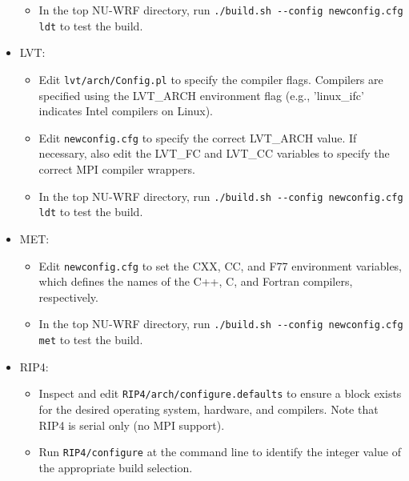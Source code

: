 \begin{itemize}
\begin{itemize}
  \item In the top NU-WRF directory, run 
    \texttt{./build.sh -\--config \mbox{newconfig.cfg} ldt} to test the 
    build.

  \end{itemize}

\item LVT:
  \begin{itemize}

  \item Edit \texttt{lvt/arch/Config.pl} to specify the compiler flags. 
    Compilers are specified using the LVT\_ARCH environment flag (e.g.,
    'linux\_ifc' indicates Intel compilers on Linux).

  \item Edit \texttt{newconfig.cfg} to specify the correct LVT\_ARCH value.
    If necessary, also edit the LVT\_FC and LVT\_CC variables to specify the
    correct MPI compiler wrappers.

  \item In the top NU-WRF directory, run 
    \texttt{./build.sh -\--config \mbox{newconfig.cfg} ldt} to test the build.

  \end{itemize}

\item MET:
  \begin{itemize}

  \item Edit \texttt{newconfig.cfg} to set the CXX, CC, and F77 environment
    variables, which defines the names of the C++, C, and Fortran compilers,
    respectively.

  \item In the top NU-WRF directory, run 
    \texttt{./build.sh -\--config \mbox{newconfig.cfg} met} to test the 
    build.

  \end{itemize}

\item RIP4:
  \begin{itemize}

  \item Inspect and edit \texttt{RIP4/arch/configure.defaults} to ensure a 
    block exists for the desired operating system, hardware, and 
    compilers. Note that RIP4 is serial only (no MPI support).

  \item Run \texttt{RIP4/configure} at the command line to identify the 
    integer value of the appropriate build selection.


\end{itemize}
\end{itemize}
